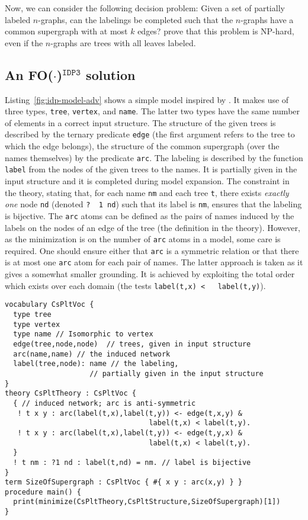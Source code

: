 \documentclass{tlp}
\newcommand{\fodotidp}{{\sc FO($\cdot$)$^{\mathtt{IDP3}}$}\xspace}
\renewcommand{\|}{\ensuremath{\,|\,}}
\renewcommand{\|}{\,|\,}
\newcommand{\idpcode}[1]{\lstinline{#1}}
\begin{document}
Now, we can consider the following decision problem: Given a set of
partially labeled $n$-graphs, can the
labelings %
be completed such that
the $n$-graphs have a common supergraph with at most $k$ edges?
 prove that this problem is NP-hard, even if the $n$-graphs
are trees with all leaves labeled.

\subsection{An \fodotidp solution}


Listing~\ref{fig:idp-model-adv} shows a simple model inspired by
\cite{ump}. It makes use of three types, \texttt{tree},
\texttt{vertex}, and \texttt{name}. The latter two types have the same
number of elements in a correct input structure. The structure of the
given trees is described by the ternary predicate \texttt{edge} (the
first argument refers to the tree to which the edge belongs), the structure of
the common supergraph (over the names themselves) by the predicate
\texttt{arc}. The labeling is described by the function \texttt{label}
from the nodes of the given trees to the names. It is partially given
in the input structure and it is completed during model expansion. The
constraint in the theory, stating that, for each name \texttt{nm} and
each tree \texttt{t}, there exists {\em exactly one} node \texttt{nd}
(denoted \idpcode{?  1 nd}) such that its label is \texttt{nm},
ensures that the labeling is bijective. The \texttt{arc} atoms can be
defined as the pairs of names induced by the labels on the nodes of an
edge of the tree (the definition in the theory). However, as the
minimization is on the number of \texttt{arc} atoms in a model, some
care is required. One should ensure either that \texttt{arc} is a
symmetric relation or that there is at most one \texttt{arc} atom for
each pair of names. The latter approach is taken as it gives a
somewhat smaller grounding. It is achieved by exploiting the total
order which exists over each domain (the tests \idpcode{label(t,x) <
  label(t,y)}).

\begin{lstlisting}[caption={Modeling {\sc cs-plt} in \fodotidp.},label={fig:idp-model-adv}]
vocabulary CsPltVoc {
  type tree
  type vertex
  type name // Isomorphic to vertex
  edge(tree,node,node)  // trees, given in input structure
  arc(name,name) // the induced network
  label(tree,node): name // the labeling,
                    // partially given in the input structure
}
theory CsPltTheory : CsPltVoc {
  { // induced network; arc is anti-symmetric
   ! t x y : arc(label(t,x),label(t,y)) <- edge(t,x,y) &
                                  label(t,x) < label(t,y).
   ! t x y : arc(label(t,x),label(t,y)) <- edge(t,y,x) &
                                  label(t,x) < label(t,y).
  }
  ! t nm : ?1 nd : label(t,nd) = nm. // label is bijective
}
term SizeOfSupergraph : CsPltVoc { #{ x y : arc(x,y) } }
procedure main() {
  print(minimize(CsPltTheory,CsPltStructure,SizeOfSupergraph)[1])
}
\end{lstlisting}
\end{document}

